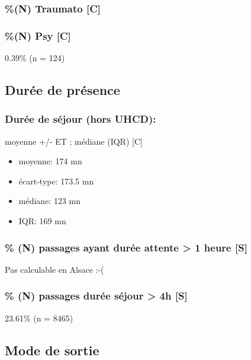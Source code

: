 \documentclass[]{article}
\begin{document}
\subsubsection{\%(N) Traumato {[}C{]}}\label{n-traumato-c}

\subsubsection{\%(N) Psy {[}C{]}}\label{n-psy-c}

0.39\% (n = 124)

\subsection{Durée de présence}\label{duree-de-presence}

\subsubsection{Durée de séjour (hors
UHCD):}\label{duree-de-sejour-hors-uhcd}

moyenne +/- ET ; médiane (IQR) {[}C{]}

\begin{itemize}
\itemsep1pt\parskip0pt
\item
  moyenne: 174 mn
\item
  écart-type: 173.5 mn
\item
  médiane: 123 mn
\item
  IQR: 169 mn
\end{itemize}

\subsubsection{\% (N) passages ayant durée attente \textgreater{} 1
heure {[}S{]}}\label{n-passages-ayant-duree-attente-1-heure-s}

Pas calculable en Alsace :-(

\subsubsection{\% (N) passages durée séjour \textgreater{} 4h
{[}S{]}}\label{n-passages-duree-sejour-4h-s}

23.61\% (n = 8465)

\subsection{Mode de sortie}\label{mode-de-sortie}
\end{document}
